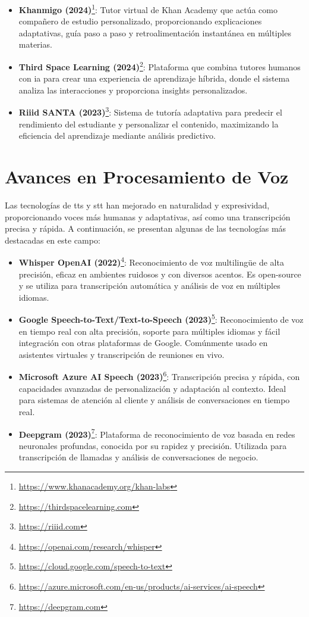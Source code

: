 \begin{itemize}
  \item \textbf{Khanmigo (2024)}\footnote{\url{https://www.khanacademy.org/khan-labs}}: Tutor virtual de Khan Academy que actúa como compañero de estudio personalizado, proporcionando explicaciones adaptativas, guía paso a paso y retroalimentación instantánea en múltiples materias.

  \item \textbf{Third Space Learning (2024)}\footnote{\url{https://thirdspacelearning.com}}: Plataforma que combina tutores humanos con \gls{ia} para crear una experiencia de aprendizaje híbrida, donde el sistema analiza las interacciones y proporciona insights personalizados.

  \item \textbf{Riiid SANTA (2023)}\footnote{\url{https://riiid.com}}: Sistema de tutoría adaptativa para predecir el rendimiento del estudiante y personalizar el contenido, maximizando la eficiencia del aprendizaje mediante análisis predictivo.
\end{itemize}

\section{Avances en Procesamiento de Voz}

Las tecnologías de \gls{tts} y \gls{stt} han mejorado en naturalidad y expresividad, proporcionando voces más humanas y adaptativas, así como una transcripción precisa y rápida. A continuación, se presentan algunas de las tecnologías más destacadas en este campo:

\begin{itemize}
  \item \textbf{Whisper OpenAI (2022)}\footnote{\url{https://openai.com/research/whisper}}: Reconocimiento de voz multilingüe de alta precisión, eficaz en ambientes ruidosos y con diversos acentos. Es \gls{open-source} y se utiliza para transcripción automática y análisis de voz en múltiples idiomas.
  \item \textbf{Google Speech-to-Text/Text-to-Speech (2023)}\footnote{\url{https://cloud.google.com/speech-to-text}}: Reconocimiento de voz en tiempo real con alta precisión, soporte para múltiples idiomas y fácil integración con otras plataformas de Google. Comúnmente usado en asistentes virtuales y transcripción de reuniones en vivo.
  \item \textbf{Microsoft Azure AI Speech (2023)}\footnote{\url{https://azure.microsoft.com/en-us/products/ai-services/ai-speech}}: Transcripción precisa y rápida, con capacidades avanzadas de personalización y adaptación al contexto. Ideal para sistemas de atención al cliente y análisis de conversaciones en tiempo real.
  \item \textbf{Deepgram (2023)}\footnote{\url{https://deepgram.com}}: Plataforma de reconocimiento de voz basada en redes neuronales profundas, conocida por su rapidez y precisión. Utilizada para transcripción de llamadas y análisis de conversaciones de negocio.
\end{itemize}

